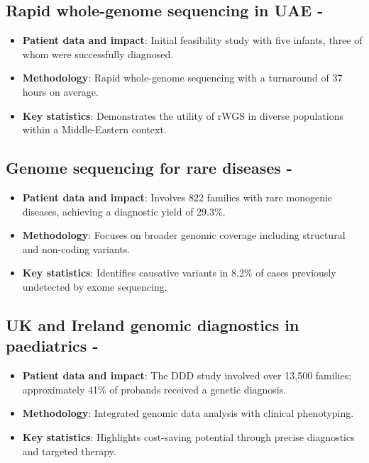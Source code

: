 \subsection*{Rapid whole-genome sequencing in UAE - \citep{abou2023rapid}}
\begin{itemize}
  \item \textbf{Patient data and impact}: Initial feasibility study with five infants, three of whom were successfully diagnosed.
  \item \textbf{Methodology}: Rapid whole-genome sequencing with a turnaround of 37 hours on average.
  \item \textbf{Key statistics}: Demonstrates the utility of rWGS in diverse populations within a Middle-Eastern context.
\end{itemize}

\subsection*{Genome sequencing for rare diseases - \citep{wojcik2024genome}}
\begin{itemize}
  \item \textbf{Patient data and impact}: Involves 822 families with rare monogenic diseases, achieving a diagnostic yield of 29.3\%.
  \item \textbf{Methodology}: Focuses on broader genomic coverage including structural and non-coding variants.
  \item \textbf{Key statistics}: Identifies causative variants in 8.2\% of cases previously undetected by exome sequencing.
\end{itemize}

\subsection*{UK and Ireland genomic diagnostics in paediatrics - \citep{wright2023genomic}}
\begin{itemize}
  \item \textbf{Patient data and impact}: The DDD study involved over 13,500 families; approximately 41\% of probands received a genetic diagnosis.
  \item \textbf{Methodology}: Integrated genomic data analysis with clinical phenotyping.
  \item \textbf{Key statistics}: Highlights cost-saving potential through precise diagnostics and targeted therapy.
\end{itemize}


